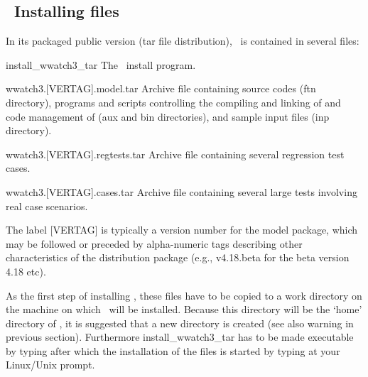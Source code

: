 \vssub
\subsection{~Installing files}\label{sec:install}
\vssub

\noindent
In its packaged public version (tar file distribution), \ws\ is
contained in several files:

\begin{list}{???}{\parsep 0mm \itemsep 0mm 
                  \leftmargin 20mm \rightmargin 5mm
                   }
\item[{\file install\_wwatch3\_tar} \hfill]
The \ws\ install program. 

\item[{\file wwatch3.[VERTAG].model.tar} \hfill] Archive file containing 
 source codes (ftn directory), programs and scripts controlling the
compiling and linking of and code management of \ws (aux and bin
directories), and sample input files (inp directory).

\item[{\file wwatch3.[VERTAG].regtests.tar} \hfill]
Archive file containing several regression test cases.

\item[{\file wwatch3.[VERTAG].cases.tar} \hfill]
Archive file containing several large tests involving real case scenarios. 

\end{list}

\noindent
The label [VERTAG] is typically a version number for the model package, which
may be followed or preceded by alpha-numeric tags describing other
characteristics of the distribution package (e.g., v4.18.beta for the beta
version 4.18 etc).

As the first step of installing \ws, these files have to be copied to a work
directory on the machine on which \ws\ will be installed. Because this
directory will be the `home' directory of \ws, it is suggested that a new
directory is created (see also warning in previous section). Furthermore
{\file install\_wwatch3\_tar} has to be made executable by typing
 after which the installation of the
files is started by typing  at your Linux/Unix
prompt.


